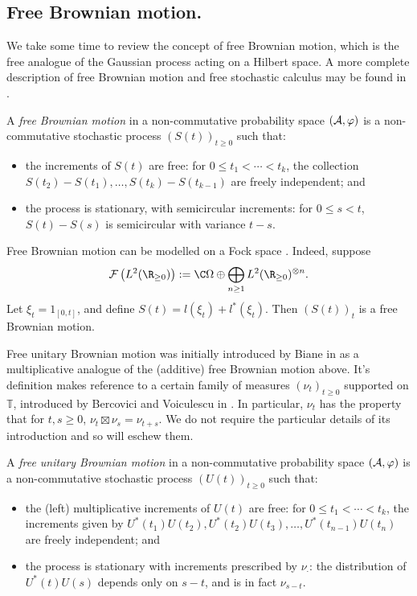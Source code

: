 \subsection{Free Brownian motion.}
We take some time to review the concept of free Brownian motion, which is the free analogue of the Gaussian process acting on a Hilbert space.
A more complete description of free Brownian motion and free stochastic calculus may be found in \cite{voiculescu1992free}.

\begin{definition}
	A \emph{free Brownian motion} in a non-commutative probability space $(\mathcal{A}, \varphi)$ is a non-commutative stochastic process $(S(t))_{t\geq0}$ such that:
	\begin{itemize}
		\item the increments of $S(t)$ are free: for $0\leq t_1 < \cdots < t_k$, the collection $S(t_2)-S(t_1), \ldots, S(t_k)-S(t_{k-1})$ are freely independent; and
		\item the process is stationary, with semicircular increments: for $0 \leq s < t$, $S(t)-S(s)$ is semicircular with variance $t-s$.
	\end{itemize}
\end{definition}

Free Brownian motion can be modelled on a Fock space \cite{voiculescu1992free}. Indeed, suppose
$$\mathcal{F}\paren{L^2(\R_{\geq0})} := \C\Omega \oplus \bigoplus_{n\geq1} L^2(\R_{\geq0})^{\otimes n}.$$
Let $\xi_t = 1_{[0, t]}$, and define $S(t) = l(\xi_t) + l^*(\xi_t)$.
Then $(S(t))_t$ is a free Brownian motion.

Free unitary Brownian motion was initially introduced by Biane in \cite{biane1997free} as a multiplicative analogue of the (additive) free Brownian motion above.
It's definition makes reference to a certain family of measures $(\nu_t)_{t\geq0}$ supported on $\mathbb{T}$, introduced by Bercovici and Voiculescu in \cite{bercovici1992levy}.
In particular, $\nu_t$ has the property that for $t, s \geq 0$, $\nu_t\boxtimes\nu_s = \nu_{t+s}$.
We do not require the particular details of its introduction and so will eschew them.

\begin{definition}
	A \emph{free unitary Brownian motion} in a non-commutative probability space $(\mathcal{A}, \varphi)$ is a non-commutative stochastic process $(U(t))_{t\geq0}$ such that:
	\begin{itemize}
		\item the (left) multiplicative increments of $U(t)$ are free: for $0 \leq t_1 < \cdots < t_k$, the increments given by $U^*(t_1)U(t_2), U^*(t_2)U(t_3), \ldots, U^*(t_{n-1})U(t_n)$ are freely independent; and
		\item the process is stationary with increments prescribed by $\nu_\cdot$: the distribution of $U^*(t)U(s)$ depends only on $s-t$, and is in fact $\nu_{s-t}$.
	\end{itemize}
\end{definition}

